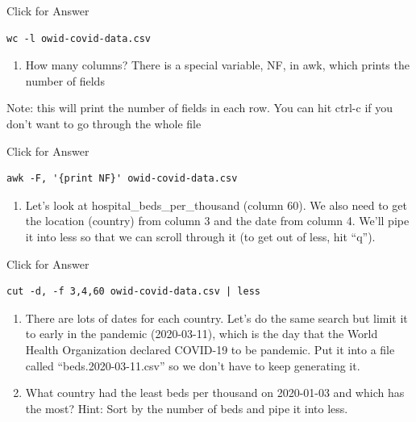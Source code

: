 \documentclass[
]{book}
\providecommand{\tightlist}{%
  \setlength{\itemsep}{0pt}\setlength{\parskip}{0pt}}
\begin{document}
Click for Answer

\begin{verbatim}
wc -l owid-covid-data.csv
\end{verbatim}

\hfill\break

\begin{enumerate}
\def\labelenumi{\arabic{enumi}.}
\setcounter{enumi}{12}
\tightlist
\item
  How many columns? There is a special variable, NF, in awk, which prints the number of fields
\end{enumerate}

Note: this will print the number of fields in each row. You can hit ctrl-c if you don't want to go through the whole file

Click for Answer

\begin{verbatim}
awk -F, '{print NF}' owid-covid-data.csv
\end{verbatim}

\hfill\break

\begin{enumerate}
\def\labelenumi{\arabic{enumi}.}
\setcounter{enumi}{13}
\tightlist
\item
  Let's look at hospital\_beds\_per\_thousand (column 60). We also need to get the location (country) from column 3 and the date from column 4. We'll pipe it into less so that we can scroll through it (to get out of less, hit ``q'').
\end{enumerate}

Click for Answer

\begin{verbatim}
cut -d, -f 3,4,60 owid-covid-data.csv | less
\end{verbatim}

\hfill\break

\begin{enumerate}
\def\labelenumi{\arabic{enumi}.}
\setcounter{enumi}{14}
\item
  There are lots of dates for each country. Let's do the same search but limit it to early in the pandemic (2020-03-11), which is the day that the World Health Organization declared COVID-19 to be pandemic. Put it into a file called ``beds.2020-03-11.csv'' so we don't have to keep generating it.
\item
  What country had the least beds per thousand on 2020-01-03 and which has the most? Hint: Sort by the number of beds and pipe it into less.
\end{enumerate}
\end{document}
